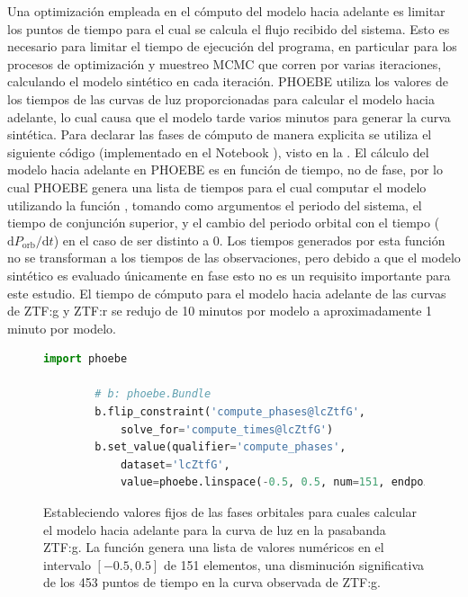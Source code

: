 Una optimización empleada en el cómputo del modelo hacia adelante es limitar los
puntos de tiempo para el cual se calcula el flujo recibido del sistema. Esto es
necesario para limitar el tiempo de ejecución del programa, en particular para
los procesos de optimización y muestreo MCMC que corren por varias iteraciones,
calculando el modelo sintético en cada iteración. PHOEBE utiliza los valores de
los tiempos de las curvas de luz proporcionadas para calcular el modelo hacia
adelante, lo cual causa que el modelo tarde varios minutos para generar la curva
sintética. Para declarar las fases de cómputo de manera explicita se utiliza el
siguiente código (implementado en el Notebook
\href{https://github.com/KnightIV/UANL_MAPTA_PlanObservaciones/blob/main/analisis/phoebe_model/estimations/ebai-default.ipynb}{}),
visto en la . El cálculo del modelo
hacia adelante en PHOEBE es en función de tiempo, no de fase, por lo cual PHOEBE
genera una lista de tiempos para el cual computar el modelo utilizando la
función , tomando como argumentos el periodo del
sistema, el tiempo de conjunción superior, y el cambio del periodo orbital con
el tiempo ($\mathrm{d}P_{\mathrm{orb}} / \mathrm{d}t$) en el caso de ser
distinto a 0. Los tiempos generados por esta función no se transforman a los
tiempos de las observaciones, pero debido a que el modelo sintético es evaluado
únicamente en fase esto no es un requisito importante para este estudio. El
tiempo de cómputo para el modelo hacia adelante de las curvas de ZTF:g y ZTF:r
se redujo de 10 minutos por modelo a aproximadamente 1 minuto por modelo.

\begin{figure}[!ht]
    \begin{lstlisting}[language=Python, autogobble]
        import phoebe

        # b: phoebe.Bundle
        b.flip_constraint('compute_phases@lcZtfG', 
            solve_for='compute_times@lcZtfG')
        b.set_value(qualifier='compute_phases', 
            dataset='lcZtfG', 
            value=phoebe.linspace(-0.5, 0.5, num=151, endpoint=True))
    \end{lstlisting}
    \caption{Estableciendo valores fijos de las fases orbitales para cuales
    calcular el modelo hacia adelante para la curva de luz  en la
    pasabanda ZTF:g. La función  genera una lista de
    valores numéricos en el intervalo $[-0.5, 0.5]$ de 151 elementos, una
    disminución significativa de los 453 puntos de tiempo en la curva observada
    de ZTF:g.}
    \label{codigoOptimizandoFasesComputoPhoebe}
\end{figure}


